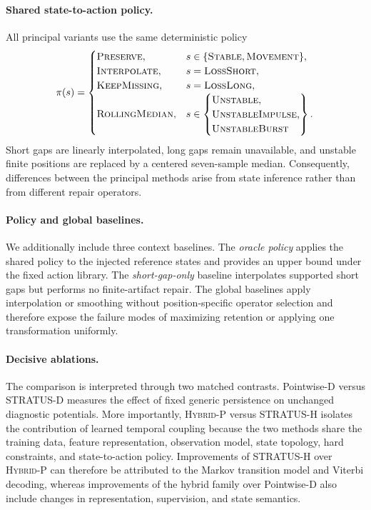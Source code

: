 \documentclass[sigconf,review]{acmart}
\newcommand{\methodHP}{\textsc{Hybrid-P}\xspace}
\newcommand{\methodH}{\textsc{STRATUS-H}\xspace}
\begin{document}
\paragraph{Shared state-to-action policy.}
All principal variants use the same deterministic policy
\[
\pi(s)
=
\begin{cases}
\textsc{Preserve},
& s\in\{\textsc{Stable},\textsc{Movement}\},\\
\textsc{Interpolate},
& s=\textsc{LossShort},\\
\textsc{KeepMissing},
& s=\textsc{LossLong},\\
\textsc{RollingMedian},
& s\in
\left\{
\begin{array}{@{}l@{}}
\textsc{Unstable},\\ \textsc{UnstableImpulse},\\
\textsc{UnstableBurst}
\end{array}
\right\}.
\end{cases}
\]
Short gaps are linearly interpolated, long gaps remain unavailable, and
unstable finite positions are replaced by a centered seven-sample median.
Consequently, differences between the principal methods arise from state
inference rather than from different repair operators.

\paragraph{Policy and global baselines.}
We additionally include three context baselines. The \emph{oracle policy} applies the shared policy to
the injected reference states and provides an upper bound under the fixed
action library. The \emph{short-gap-only} baseline interpolates supported
short gaps but performs no finite-artifact repair. The global baselines
apply interpolation or smoothing without position-specific operator
selection and therefore expose the failure modes of maximizing retention
or applying one transformation uniformly.

\paragraph{Decisive ablations.}
The comparison is interpreted through two matched contrasts.
Pointwise-D versus STRATUS-D measures the effect of fixed generic
persistence on unchanged diagnostic potentials. More importantly,
\methodHP versus \methodH isolates the contribution of learned temporal
coupling because the two methods share the training data, feature
representation, observation model, state topology, hard constraints, and
state-to-action policy. Improvements of \methodH over \methodHP can
therefore be attributed to the Markov transition model and Viterbi
decoding, whereas improvements of the hybrid family over Pointwise-D also
include changes in representation, supervision, and state semantics.
\end{document}
